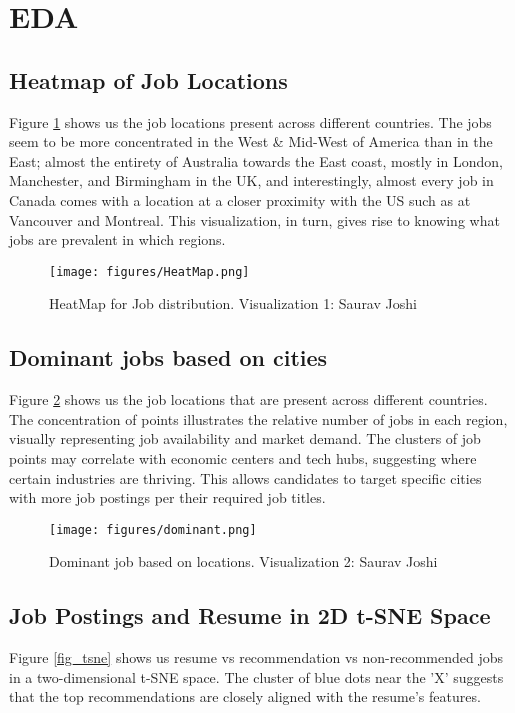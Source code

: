 \documentclass[a4paper,10pt]{article}
\begin{document}
\section{EDA}
    
 \subsection{Heatmap of Job Locations}

      Figure \ref{fig_heatmap} shows us the job locations present across different countries. The jobs seem to be more concentrated in the West \& Mid-West of America than in the East; almost the entirety of Australia towards the East coast, mostly in London, Manchester, and Birmingham in the UK, and interestingly, almost every job in Canada comes with a location at a closer proximity with the US such as at Vancouver and Montreal. This visualization, in turn, gives rise to knowing what jobs are prevalent in which regions.

    \begin{figure}[ht]
    \centering
    \texttt{[image: figures/HeatMap.png]}
    \caption{HeatMap for Job distribution. Visualization 1: Saurav Joshi}
    \label{fig_heatmap}
    \end{figure}


 \subsection{Dominant jobs based on cities}
      Figure \ref{fig_dominant_jobs} shows us the job locations that are present across different countries. The concentration of points illustrates the relative number of jobs in each region, visually representing job availability and market demand. The clusters of job points may correlate with economic centers and tech hubs, suggesting where certain industries are thriving. This allows candidates to target specific cities with more job postings per their required job titles.

    \begin{figure}[ht]
    \centering
    \texttt{[image: figures/dominant.png]}
    \caption{Dominant job based on locations. Visualization 2: Saurav Joshi}
    \label{fig_dominant_jobs}
    \end{figure}

 \subsection{Job Postings and Resume in 2D t-SNE Space}
      Figure \ref{fig_tsne} shows us resume vs recommendation vs non-recommended jobs in a two-dimensional t-SNE space. The cluster of blue dots near the 'X' suggests that the top recommendations are closely aligned with the resume's features.
\end{document}
